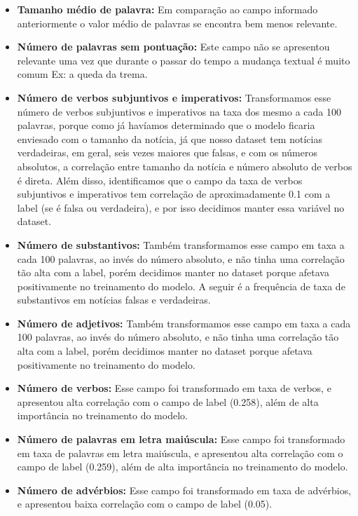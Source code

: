 \documentclass[
  brazilian,
  11pt,
]{article}
\begin{document}
\begin{itemize}
  \textbf{Tamanho médio da sentença:} No tamanho médio, identificamos também diferença relevante entre notícias verdadeiras e falsas.
\item
  \textbf{Tamanho médio de palavra:} Em comparação ao campo informado anteriormente o valor médio de palavras se encontra bem menos relevante.
\item
  \textbf{Número de palavras sem pontuação:} Este campo não se apresentou relevante uma vez que durante o passar do tempo a mudança textual é muito comum Ex: a queda da trema.
\item
  \textbf{Número de verbos subjuntivos e imperativos:} Transformamos esse número de verbos subjuntivos e imperativos na taxa dos mesmo a cada 100 palavras, porque como já havíamos determinado que o modelo ficaria enviesado com o tamanho da notícia, já que nosso dataset tem notícias verdadeiras, em geral, seis vezes maiores que falsas, e com os números absolutos, a correlação entre tamanho da notícia e número absoluto de verbos é direta. Além disso, identificamos que o campo da taxa de verbos subjuntivos e imperativos tem correlação de aproximadamente 0.1 com a label (se é falsa ou verdadeira), e por isso decidimos manter essa variável no dataset.
\item
  \textbf{Número de substantivos:} Também transformamos esse campo em taxa a cada 100 palavras, ao invés do número absoluto, e não tinha uma correlação tão alta com a label, porém decidimos manter no dataset porque afetava positivamente no treinamento do modelo. A seguir é a frequência de taxa de substantivos em notícias falsas e verdadeiras.
\item
  \textbf{Número de adjetivos:} Também transformamos esse campo em taxa a cada 100 palavras, ao invés do número absoluto, e não tinha uma correlação tão alta com a label, porém decidimos manter no dataset porque afetava positivamente no treinamento do modelo.
\item
  \textbf{Número de verbos:} Esse campo foi transformado em taxa de verbos, e apresentou alta correlação com o campo de label (0.258), além de alta importância no treinamento do modelo.
\item
  \textbf{Número de palavras em letra maiúscula:} Esse campo foi transformado em taxa de palavras em letra maiúscula, e apresentou alta correlação com o campo de label (0.259), além de alta importância no treinamento do modelo.
\item
  \textbf{Número de advérbios:} Esse campo foi transformado em taxa de advérbios, e apresentou baixa correlação com o campo de label (0.05).

\end{itemize}
\end{document}
